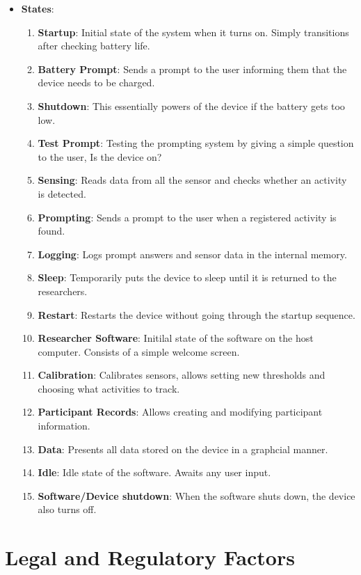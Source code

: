 \documentclass[12pt]{article}
\begin{document}
\begin{itemize}
\item \textbf{States}:
	\begin{enumerate}
		\item \textbf{Startup}: Initial state of the system when it turns on. Simply transitions after checking battery life.           
		\item \textbf{Battery Prompt}: Sends a prompt to the user informing them that the device needs to be charged.
		\item \textbf{Shutdown}: This essentially powers of the device if the battery gets too low. 
		\item \textbf{Test Prompt}: Testing the prompting system by giving a simple question to the user, Is the device on?
		\item \textbf{Sensing}: Reads data from all the sensor and checks whether an activity is detected.
		\item \textbf{Prompting}: Sends a prompt to the user when a registered activity is found. 
		\item \textbf{Logging}: Logs prompt answers and sensor data in the internal memory.
		\item \textbf{Sleep}: Temporarily puts the device to sleep until it is returned to the researchers.
		\item \textbf{Restart}: Restarts the device without going through the startup sequence.
		\item \textbf{Researcher Software}: Initilal state of the software on the host computer. Consists of a simple welcome screen.
		\item \textbf{Calibration}: Calibrates sensors, allows setting new thresholds and choosing what activities to track.
		\item \textbf{Participant Records}: Allows creating and modifying participant information.
		\item \textbf{Data}: Presents all data stored on the device in a graphcial manner.
		\item \textbf{Idle}: Idle state of the software. Awaits any user input.
		\item \textbf{Software/Device shutdown}: When the software shuts down, the device also turns off.
	\end{enumerate}
\end{itemize}
\newpage
\section{Legal and Regulatory Factors}
\label{Legal}
\end{document}
